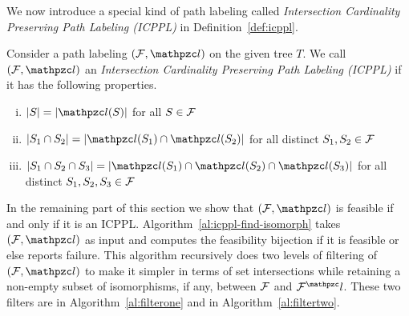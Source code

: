 We now introduce a special kind of path labeling called {\em
  Intersection Cardinality Preserving Path Labeling (ICPPL)} in
Definition~\ref{def:icppl}.

\begin{definition}
  \label{def:icppl}
  Consider a path labeling $(\cF, \cl)$ on the given tree $T$. We call
  $(\cF, \cl)$ an {\em Intersection Cardinality Preserving Path
    Labeling (ICPPL)} if it has the following properties.
  \par
  \parbox{\linewidth}{%
    \hangindent {}%
    \begin{enumerate}[i. ] %
      \singlespacing
    \item \label{pr:i} $|S| = |\cl(S)|$ for all $S \in {\cal F}$
    \item \label{pr:ii}$|S_1 \cap S_2| = |\cl(S_1) \cap \cl(S_2)|$ for
    all distinct $S_1, S_2 \in {\cal F}$
    \item \label{pr:iii}$|S_1 \cap S_2 \cap S_3| = |\cl(S_1) \cap
    \cl(S_2) \cap \cl(S_3)|$ for all distinct $S_1, S_2, S_3 \in {\cal F}$
    \end{enumerate}
  }
\end{definition}


In the remaining part of this section we show that $(\cF, \cl)$ is
feasible if and only if it is an ICPPL.
Algorithm~\ref{al:icppl-find-isomorph} takes $(\cF, \cl)$ as input and
computes the feasibility bijection if it is feasible or else reports
failure. This algorithm recursively does two levels of filtering of
$(\cF, \cl)$ to make it simpler in terms of set intersections while
retaining a non-empty subset of isomorphisms, if any, between ${\cal F}$
and $\cF^\cl$. These two filters are \filteri in
Algorithm~\ref{al:filterone} and \filterii in
Algorithm~\ref{al:filtertwo}.

